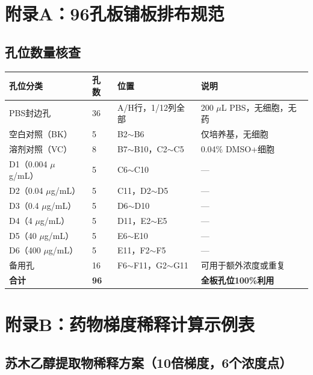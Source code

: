 \documentclass[12pt,a4paper]{article}
\newcommand{\um}{\,$\mu$g/mL}
\newcommand{\uul}{\,$\mu$L}
\begin{document}
\appendix
\section{附录A：96孔板铺板排布规范}

\subsection{孔位数量核查}

\begin{center}
\begin{tabular}{lllp{6cm}}
\toprule
\rowcolor{tabheadbg}\color{white}\textbf{孔位分类} & \color{white}\textbf{孔数} & \color{white}\textbf{位置} & \color{white}\textbf{说明} \\
\midrule
PBS封边孔 & 36 & A/H行，1/12列全部 & 200\,\uul{} PBS，无细胞，无药 \\
空白对照（BK）& 5 & B2$\sim$B6 & 仅培养基，无细胞 \\
溶剂对照（VC）& 8 & B7$\sim$B10，C2$\sim$C5 & 0.04\% DMSO+细胞 \\
D1（0.004\,\um{}）& 5 & C6$\sim$C10 & — \\
D2（0.04\,\um{}）& 5 & C11，D2$\sim$D5 & — \\
D3（0.4\,\um{}）& 5 & D6$\sim$D10 & — \\
D4（4\,\um{}）& 5 & D11，E2$\sim$E5 & — \\
D5（40\,\um{}）& 5 & E6$\sim$E10 & — \\
D6（400\,\um{}）& 5 & E11，F2$\sim$F5 & — \\
备用孔 & 16 & F6$\sim$F11，G2$\sim$G11 & 可用于额外浓度或重复 \\
\textbf{合计} & \textbf{96} & & \textbf{全板孔位100\%利用} \\
\bottomrule
\end{tabular}
\end{center}

\section{附录B：药物梯度稀释计算示例表}

\subsection{苏木乙醇提取物稀释方案（10倍梯度，6个浓度点）}
\end{document}
